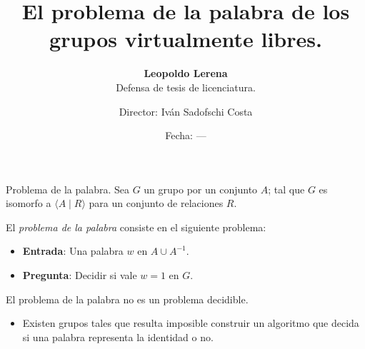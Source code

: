 \documentclass[aspectratio=169, 10pt]{beamer}
\title{El problema de la palabra de los grupos virtualmente libres.}
\subtitle{\textbf{Leopoldo Lerena} \\
		Defensa de tesis de licenciatura.}
\date{Fecha: ---}
\author{Director: Iván Sadofschi Costa}
\institute{Universidad de Buenos Aires}
\begin{document}
	\maketitle

	
	
	
	\begin{frame}[fragile]{Problema de la palabra.}
		Sea $G$ un grupo \fg por un conjunto $A$; 
		tal que $G$ es isomorfo a $\langle A \mid R \rangle$ para un conjunto de relaciones $R$.
		
		El \emph{problema de la palabra} consiste en el siguiente problema:
	
		\begin{itemize}
					\item 
						\textbf{Entrada}: Una palabra $w$ en $A \cup A^{-1}$.
					
					\item 
						\textbf{Pregunta}: Decidir si vale $w=1$ en $G$.
		\end{itemize}

		El problema de la palabra no es un problema \alert{decidible}.
		\begin{itemize}
			\item 
				Existen grupos tales que resulta imposible construir un algoritmo que decida si una palabra representa la identidad o no.
		\end{itemize}
		

	\end{frame}
\end{document}
